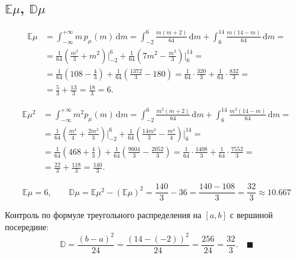 \documentclass[12pt]{article}
\begin{document}
\subsection{$\mathbb{E}\mu$, $\mathbb{D}\mu$}

\begin{align*}
    \mathbb{E}\mu &= \int_{-\infty}^{+\infty} m\,p_\mu(m)\,\mathrm{d}m
    = \int_{-2}^{6} \frac{m(m+2)}{64}\,\mathrm{d}m + \int_{6}^{14} \frac{m(14-m)}{64}\,\mathrm{d}m = \\[1ex]
    &= \frac{1}{64}\left(\frac{m^3}{3} + m^2\right)\bigg|_{-2}^{6}
     + \frac{1}{64}\left(7m^2 - \frac{m^3}{3}\right)\bigg|_{6}^{14} = \\[1ex]
    &= \frac{1}{64}\left(108 - \frac{4}{3}\right) + \frac{1}{64}\left(\frac{1372}{3} - 180\right)
     = \frac{1}{64}\cdot\frac{320}{3} + \frac{1}{64}\cdot\frac{832}{3} = \\[1ex]
    &= \frac{5}{3} + \frac{13}{3} = \frac{18}{3} = 6.
\end{align*}

\begin{align*}
    \mathbb{E}\mu^2 &= \int_{-\infty}^{+\infty} m^2 p_\mu(m)\,\mathrm{d}m
    = \int_{-2}^{6} \frac{m^2(m+2)}{64}\,\mathrm{d}m + \int_{6}^{14} \frac{m^2(14-m)}{64}\,\mathrm{d}m = \\[1ex]
    &= \frac{1}{64}\left(\frac{m^4}{4} + \frac{2m^3}{3}\right)\bigg|_{-2}^{6}
     + \frac{1}{64}\left(\frac{14m^3}{3} - \frac{m^4}{4}\right)\bigg|_{6}^{14} = \\[1ex]
    &= \frac{1}{64}\left(468 + \frac{4}{3}\right) + \frac{1}{64}\left(\frac{9604}{3} - \frac{2052}{3}\right)
     = \frac{1}{64}\cdot\frac{1408}{3} + \frac{1}{64}\cdot\frac{7552}{3} = \\[1ex]
    &= \frac{22}{3} + \frac{118}{3} = \frac{140}{3}.
\end{align*}

\[
    \boxed{\;
    \mathbb{E}\mu = 6, \qquad
    \mathbb{D}\mu = \mathbb{E}\mu^2 - (\mathbb{E}\mu)^2 = \frac{140}{3} - 36 = \frac{140 - 108}{3}
    = \frac{32}{3} \approx 10.667
    \;}
\]

Контроль по формуле треугольного распределения на $[a,b]$ с вершиной посередине:
\[
    \mathbb{D} = \frac{(b-a)^2}{24} = \frac{(14-(-2))^2}{24} = \frac{256}{24} = \frac{32}{3}. \quad\blacksquare
\]
\end{document}
